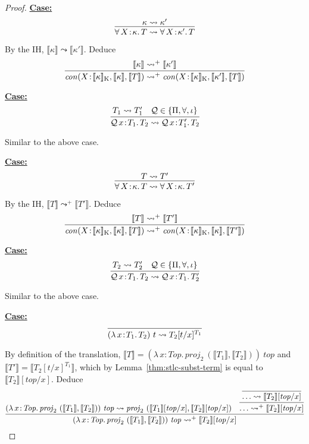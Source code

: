 \documentclass{article}
\newcommand{\abs}[4]{{#1}\, #2\! : \! #3.\, #4}
\newcommand{\interp}[1]{\llbracket #1 \rrbracket}
\newcommand{\startcase}[1]{\vspace{#1} \noindent\textbf{\underline{Case:}}}
\begin{document}
\begin{proof}
  \startcase{.2cm}
  \[
    \infer{
      \abs{\forall}{X}{\kappa}{T} \leadsto \abs{\forall}{X}{\kappa'}{T}
    }{
      \kappa \leadsto \kappa'
    }
  \]

  By the IH, \(\interp{\kappa} \leadsto \interp{\kappa'}\).
  Deduce
  \[
    \infer{
      \mathit{con}(X\!:\!\interp{\kappa}_{\text{K}},\interp{\kappa},\interp{T})
      \leadsto^+
      \mathit{con}(X\!:\!\interp{\kappa}_{\text{K}},\interp{\kappa'},\interp{T})
    }{
      \interp{\kappa} \leadsto^+ \interp{\kappa'}
    }
  \]

  \startcase{.2cm}
  \[
    \infer{
      \abs{\mathcal{Q}}{x}{T_1}{T_2}
      \leadsto
      \abs{\mathcal{Q}}{x}{T_1'}{T_2}
    }{
      T_1 \leadsto T_1'
      & \mathcal{Q} \in \{\Pi,\forall,\iota\}
    }
  \]

  Similar to the above case.
  
  \startcase{.2cm}
  \[
    \infer{
      \abs{\forall}{X}{\kappa}{T} \leadsto \abs{\forall}{X}{\kappa}{T'}
    }{
      T \leadsto T'
    }
  \]

  By the IH, \(\interp{T} \leadsto^+ \interp{T'}\).
  Deduce
  \[
    \infer{
      \mathit{con}(X\!:\!\interp{\kappa}_{\text{K}},\interp{\kappa},\interp{T})
      \leadsto^+
      \mathit{con}(X\!:\!\interp{\kappa}_{\text{K}},\interp{\kappa},\interp{T'})
    }{
      \interp{T} \leadsto^+ \interp{T'}
    }
  \]

  \startcase{.2cm}
  \[
    \infer{
      \abs{\mathcal{Q}}{x}{T_1}{T_2} \leadsto \abs{\mathcal{Q}}{x}{T_1}{T_2'}
    }{
      T_2 \leadsto T_2'
      & \mathcal{Q} \in \{\Pi,\forall,\iota\}
    }
  \]  

  Similar to the above case.

  \startcase{.2cm}
  \[
    \infer{
      (\abs{\lambda}{x}{T_1}{T_2})\ t \leadsto T_2 [t/x]^{T_1}
    }{}
  \]

  By definition of the translation, \(\interp{T} =
  (\abs{\lambda}{x}{\mathit{Top}}{\mathit{proj}_2\
    (\interp{T_1},\interp{T_2})})\ \mathit{top}\) and 
  \(\interp{T'} = \interp{T_2[t/x]^{T_1}}\), which by
  Lemma~\ref{thm:stlc-subst-term} is equal to \(\interp{T_2}[\mathit{top}/x]\).
  Deduce
  \[
    \infer{
      (\abs{\lambda}{x}{\mathit{Top}}{\mathit{proj}_2\ (\interp{T_1},\interp{T_2})})\ \mathit{top}
      \leadsto^+ \interp{T_2}[\mathit{top}/x]
    }{
      (\abs{\lambda}{x}{\mathit{Top}}{\mathit{proj}_2\ (\interp{T_1},\interp{T_2})})\ \mathit{top}
      \leadsto
      \mathit{proj}_2\
      (\interp{T_1}[\mathit{top}/x],\interp{T_2}[\mathit{top}/x])
      &
      \infer{
        \ldots
        \leadsto^+
        \interp{T_2}[\mathit{top}/x]
      }{
        \infer{
          \ldots \leadsto \interp{T_2}[\mathit{top}/x]
        }{}
      }
    }
  \]



\end{proof}
\end{document}
